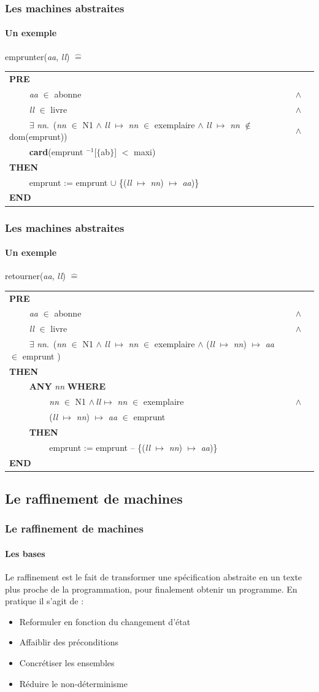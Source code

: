 \documentclass[11pt,a4paper,xcolor=table, handout]{beamer} %
\newcommand{\Bequal}{\mathrel{\widehat{=}}}
\begin{document}
\begin{frame}
\frametitle{Les machines abstraites}
\framesubtitle{Un exemple}
\indent emprunter(\emph{aa}, \emph{ll}) $\Bequal$
\begin{longtable}{lll}
\textbf{PRE} \tabularnewline
~~~~ \emph{aa} $\in$ abonne & $\wedge$ \tabularnewline 
~~~~ \emph{ll} $\in$ livre & $\wedge$ \tabularnewline
~~~~ $\exists$ \emph{nn}.\ (\emph{nn} $\in$ N1 $\wedge$ \emph{ll} $\mapsto$ \emph{nn} $\in$ exemplaire $\wedge$ \emph{ll} $\mapsto$ \emph{nn} $\notin$ dom(emprunt)) & $\wedge$ \tabularnewline
~~~~ \textbf{card}(emprunt $^{-1}$[$\{$ab$\}$] $<$ maxi) \tabularnewline
\textbf{THEN} \tabularnewline ~~~~ emprunt := emprunt $\cup$ \{(\emph{ll} $\mapsto$ \emph{nn}) $\mapsto$ \emph{aa})\} \tabularnewline
\textbf{END} \tabularnewline
\end{longtable}
\end{frame}

\begin{frame}
\frametitle{Les machines abstraites}
\framesubtitle{Un exemple}
\indent retourner(\emph{aa}, \emph{ll}) $\Bequal$
\begin{longtable}{lll}
\textbf{PRE} \tabularnewline
~~~~ \emph{aa} $\in$ abonne & $\wedge$ \tabularnewline 
~~~~ \emph{ll} $\in$ livre & $\wedge$ \tabularnewline
~~~~ $\exists$ \emph{nn}.\ (\emph{nn} $\in$ N1 $\wedge$ \emph{ll} $\mapsto$ \emph{nn} $\in$ exemplaire $\wedge$ (\emph{ll} $\mapsto$ \emph{nn}) $\mapsto$ \emph{aa} $\in$ emprunt )\tabularnewline
\textbf{THEN} \tabularnewline
~~~~ \textbf{ANY} \emph{nn} \textbf{WHERE} \tabularnewline
~~~~ ~~~~ \emph{nn} $\in$ N1 $\wedge~ll \mapsto$ \emph{nn} $\in$ exemplaire & $\wedge$ \tabularnewline
~~~~ ~~~~ (\emph{ll} $\mapsto$ \emph{nn}) $\mapsto$ \emph{aa} $\in$ emprunt \tabularnewline
~~~~ \textbf{THEN} \tabularnewline
~~~~ ~~~~ emprunt := emprunt -- \{(\emph{ll} $\mapsto$ \emph{nn}) $\mapsto$ \emph{aa})\} \tabularnewline
\textbf{END} \tabularnewline
\end{longtable}
\end{frame}

\subsection{Le raffinement de machines}
\begin{frame}
\frametitle{Le raffinement de machines}
\framesubtitle{Les bases}
Le raffinement est le fait de transformer une spécification abstraite en un texte plus proche de la programmation, pour finalement obtenir un programme.
\pause
En pratique il s'agit de :
\begin{itemize}
\item Reformuler en fonction du changement d'état
\item Affaiblir des préconditions
\item Concrétiser les ensembles
\item Réduire le non-déterminisme
\end{itemize}
\end{frame}
\end{document}
